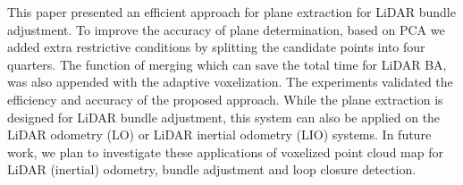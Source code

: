 \documentclass[letterpaper, 10 pt, conference]{ieeeconf}  %
\begin{document}
This paper presented an efficient approach for plane extraction for LiDAR bundle adjustment. To improve the accuracy of plane determination, based on PCA we added extra restrictive conditions by splitting the candidate points into four quarters. The function of merging which can save the total time for LiDAR BA, was also appended with the adaptive voxelization. The experiments validated the efficiency and accuracy of the proposed approach. While the plane extraction is designed for LiDAR bundle adjustment, this system can also be applied on the LiDAR odometry (LO) or LiDAR inertial odometry (LIO) systems. In future work, we plan to investigate these applications of voxelized point cloud map for LiDAR (inertial) odometry, bundle adjustment and loop closure detection.


\end{document}
